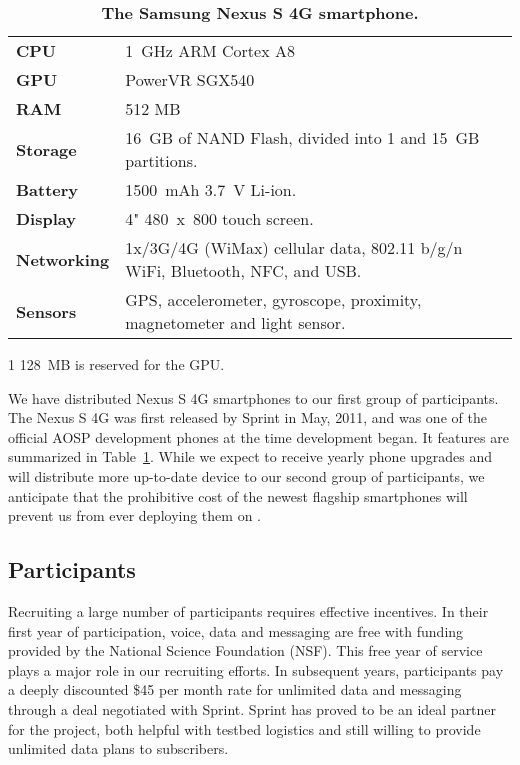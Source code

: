 \begin{table}[t]
\vspace*{0.19in}
\begin{threeparttable}
\begin{tabularx}{\columnwidth}{lX}
\toprule
\textbf{CPU} & 1~GHz ARM Cortex A8 \\
\textbf{GPU} & PowerVR SGX540 \\
\textbf{RAM} & 512 MB\tnote{1} \\
\textbf{Storage} & 16~GB of NAND Flash, divided into 1 and 15~GB partitions.\\
\textbf{Battery} & \num{1500}~mAh 3.7~V Li-ion.\\
\textbf{Display} & 4" 480~x~800 touch screen.\\
\textbf{Networking} & 1x/3G/4G (WiMax) cellular data, 802.11 b/g/n WiFi,
Bluetooth, NFC, and USB.\\
\textbf{Sensors} & GPS, accelerometer, gyroscope, proximity, magnetometer and light sensor.\\
\bottomrule
\end{tabularx}

{\footnotesize
\begin{tablenotes}
\item [1] 128~MB is reserved for the GPU.
\end{tablenotes}}

\caption{\textbf{The Samsung Nexus S 4G smartphone.}}
\label{table-nexuss4g}
\end{threeparttable}
\end{table}

We have distributed Nexus S 4G smartphones to our first group of
participants. The Nexus S 4G was first released by Sprint in May, 2011, and
was one of the official AOSP development phones at the time \PhoneLab{}
development began. It features are summarized in Table~\ref{table-nexuss4g}.
While we expect to receive yearly phone upgrades and will distribute more
up-to-date device to our second group of participants, we anticipate that the
prohibitive cost of the newest flagship smartphones will prevent us from ever
deploying them on \PhoneLab{}.

\subsection{Participants}

Recruiting a large number of \PhoneLab{} participants requires effective
incentives. In their first year of \PhoneLab{} participation, voice, data and
messaging are free with funding provided by the National Science Foundation
(NSF). This free year of service plays a major role in our recruiting
efforts. In subsequent years, participants pay a deeply discounted \$45 per
month rate for unlimited data and messaging through a deal negotiated with
Sprint. Sprint has proved to be an ideal partner for the \PhoneLab{} project,
both helpful with testbed logistics and still willing to provide unlimited
data plans to subscribers.

